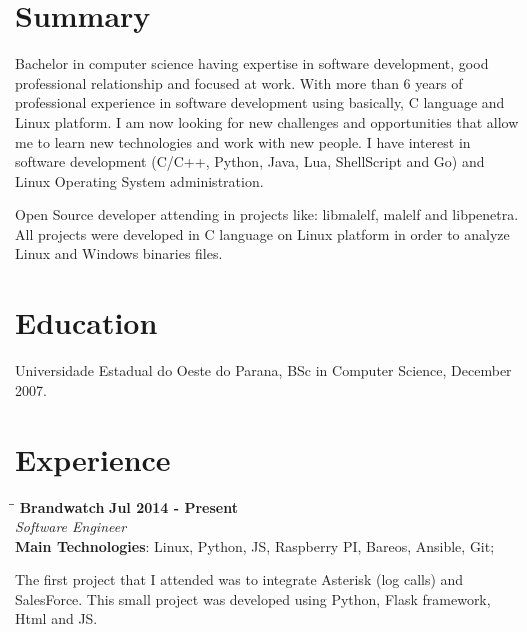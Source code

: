 \documentclass[margin]{res}
\begin{document}
  

\address{Brighton, UK \\ benatto@gmail.com \\ Phone: +44 07405110040 \\ Post Code: SW16 2BU }
                           
                        
\begin{resume}                        
 
\section{Summary}       Bachelor in computer science having expertise in software development, good professional   
                        relationship and focused at work. With more than 6 years of professional experience in software development using basically, C language and Linux platform. I am now looking for new challenges and opportunities that allow me to learn new technologies and work with new people. I have interest in software development (C/C++, Python, Java, Lua, ShellScript and Go) and Linux Operating System administration.
                        
                        Open Source developer attending in projects like: libmalelf, malelf and libpenetra. All projects were developed in C language on Linux platform in order to analyze Linux and Windows binaries files.
 
\section{Education}	Universidade Estadual do Oeste do Parana, BSc in Computer Science, December 2007.
  
\section{Experience}

\vspace{-0.1in}
   \begin{tabbing}
   \hspace{2.3in}\= \hspace{1.7in}\= \kill %
    \textbf{Brandwatch}    \>\>\textbf{Jul 2014 - Present}\\
    \textit{Software Engineer}\\        
    \textbf{Main Technologies}: Linux, Python, JS, Raspberry PI, Bareos, Ansible, Git;
   \end{tabbing}\vspace{-20pt}      %
    \vspace{2mm}
The first project that I attended was to integrate Asterisk (log calls) and SalesForce. This small project was developed using Python, Flask framework, Html and JS.


\end{resume}
\end{document}

